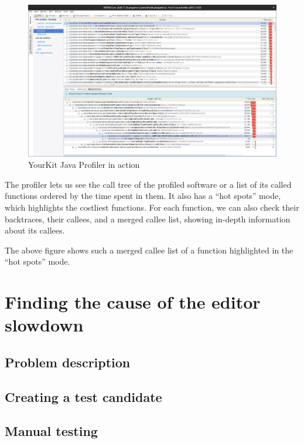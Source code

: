 \documentclass[11pt,a4paper,oneside]{report}
\begin{document}
\begin{figure}[ht]
\centering
\includegraphics[width=150mm, keepaspectratio]{figures/yourkit-profiler.png}
\caption{YourKit Java Profiler in action}
\label{fig:yourkit-profiler}
\end{figure}

The profiler lets us see the call tree of the profiled software or a list of its
called functions ordered by the time spent in them. It also has a ``hot spots''
mode, which highlights the costliest functions. For each function, we can also
check their backtraces, their callees, and a merged callee list, showing
in-depth information about its callees.

The above figure shows such a merged callee list of a function highlighted in
the ``hot spots'' mode.

\chapter{Finding the cause of the editor slowdown}
\section{Problem description}

\section{Creating a test candidate}

\section{Manual testing}
\end{document}
